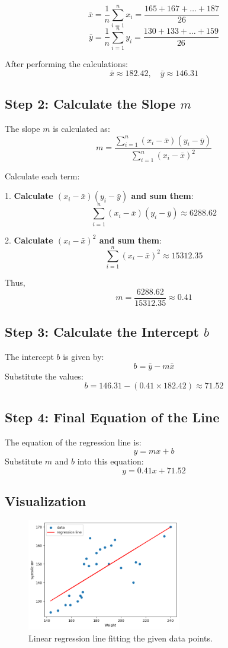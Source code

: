 \documentclass{article}
\begin{document}
	\[
	\bar{x} = \frac{1}{n} \sum_{i=1}^{n} x_i = \frac{165 + 167 + \dots + 187}{26}
	\]
	\[
	\bar{y} = \frac{1}{n} \sum_{i=1}^{n} y_i = \frac{130 + 133 + \dots + 159}{26}
	\]
	
	After performing the calculations:
	\[
	\bar{x} \approx 182.42, \quad \bar{y} \approx 146.31
	\]
	
	\subsection*{Step 2: Calculate the Slope \( m \)}
	The slope \( m \) is calculated as:
	\[
	m = \frac{\sum_{i=1}^{n} (x_i - \bar{x})(y_i - \bar{y})}{\sum_{i=1}^{n} (x_i - \bar{x})^2}
	\]
	
	Calculate each term:
	
	1. \textbf{Calculate \( (x_i - \bar{x})(y_i - \bar{y}) \) and sum them}:
	\[
	\sum_{i=1}^{n} (x_i - \bar{x})(y_i - \bar{y}) \approx 6288.62
	\]
	
	2. \textbf{Calculate \( (x_i - \bar{x})^2 \) and sum them}:
	\[
	\sum_{i=1}^{n} (x_i - \bar{x})^2 \approx 15312.35
	\]
	
	Thus,
	\[
	m = \frac{6288.62}{15312.35} \approx 0.41
	\]
	
	\subsection*{Step 3: Calculate the Intercept \( b \)}
	The intercept \( b \) is given by:
	\[
	b = \bar{y} - m \bar{x}
	\]
	Substitute the values:
	\[
	b = 146.31 - (0.41 \times 182.42) \approx 71.52
	\]
	
	\subsection*{Step 4: Final Equation of the Line}
	The equation of the regression line is:
	\[
	y = mx + b
	\]
	Substitute \( m \) and \( b \) into this equation:
	\[
	y = 0.41x + 71.52
	\]
	
	\subsection*{Visualization}
	\begin{figure}[h!]
		\centering
		\includegraphics[width=0.6\textwidth]{./images/task1_output.png}
		\caption{Linear regression line fitting the given data points.}
		\label{fig:image1}
	\end{figure}
	
\end{document}
